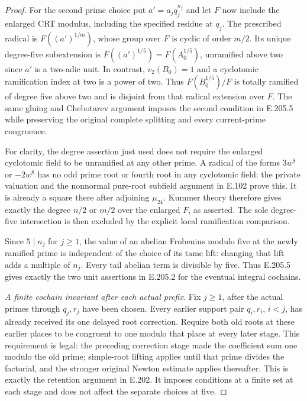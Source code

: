 \begin{proof}
For the second prime choice put $a'=a_jq_j^{n_j}$ and let $F$
now include the enlarged CRT modulus, including the specified
residue at $q_j$.  The prescribed radical is
$F((a')^{1/m})$, whose group over $F$ is cyclic of order $m/2$.
Its unique degree-five subextension is
$F((a')^{1/5})=F(A_0^{1/5})$, unramified above two since
$a'$ is a two-adic unit.  In contrast, $v_2(B_0)=1$ and a
cyclotomic ramification index at two is a power of two.
Thus $F(B_0^{1/5})/F$ is totally ramified of degree five above
two and is disjoint from that radical extension over $F$.
The same gluing and Chebotarev argument imposes the second
condition in E.205.5 while preserving the original complete
splitting and every current-prime congruence.

For clarity, the degree assertion just used does not require
the enlarged cyclotomic field to be unramified at any other
prime.  A radical of the forms $3w^8$ or $-2w^8$ has no
odd prime root or fourth root in any cyclotomic field: the
private valuation and the nonnormal pure-root subfield argument
in E.102 prove this.  It is already a square there after
adjoining $\mu_{24}$.  Kummer theory therefore gives exactly
the degree $n/2$ or $m/2$ over the enlarged $F$, as asserted.
The sole degree-five intersection is then excluded by the
explicit local ramification comparison.

Since $5\mid n_j$ for $j\geq1$, the value of an abelian
Frobenius modulo five at the newly ramified prime is independent
of the choice of its tame lift: changing that lift adds a
multiple of $n_j$.  Every tail abelian term is divisible by
five.  Thus E.205.5 gives exactly the two unit assertions in
E.205.2 for the eventual integral cochains.

\emph{A finite cochain invariant after each actual prefix.}
Fix $j\geq1$, after the actual primes through $q_j,r_j$ have
been chosen.  Every earlier support pair $q_i,r_i$, $i<j$, has
already received its one delayed root correction.  Require both
old roots at these earlier places to be congruent to one modulo
that place at every later stage.  This requirement is legal:
the preceding correction stage made the coefficient sum one
modulo the old prime; simple-root lifting applies until that
prime divides the factorial, and the stronger original Newton
estimate applies thereafter.  This is exactly the retention
argument in E.202.  It imposes conditions at a finite set at
each stage and does not affect the separate choices at five.


\end{proof}
